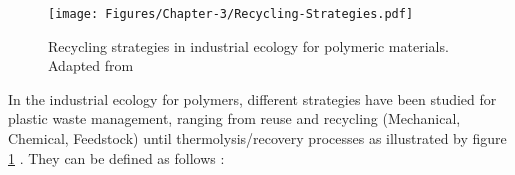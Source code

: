 \begin{figure}[!htb]
	\centering
	\texttt{[image: Figures/Chapter-3/Recycling-Strategies.pdf]}
	\caption{ Recycling strategies in industrial ecology for polymeric materials. Adapted from \parencite{Clift1997, Perugini2005} }
	\label{Chap-3:Fig.Recycling.Strategies}
\end{figure}



In the industrial ecology for polymers, different strategies have been studied  for plastic waste management, ranging from reuse and  recycling (Mechanical, Chemical, Feedstock) until thermolysis/recovery processes as illustrated by figure \ref{Chap-3:Fig.Recycling.Strategies} \parencite{Clift1997, Hopewell2009, Al-Salem2009}.
They can be defined as follows \parencite{Al-Salem2009, Al-Salem2010}:

